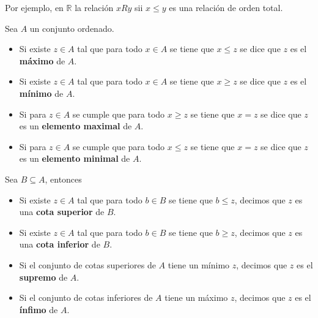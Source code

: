 \begin{example}
Por ejemplo, en $\mathbb{R}$ la relación $xRy$ sii $x \leq y$ es una relación de orden total.
\end{example}


\begin{definition} \label{maximo}

Sea $A$ un conjunto ordenado.  

\begin{itemize}

\item Si existe $z \in A$ tal que para todo $x \in A$ se tiene que $x \leq z$ se dice que $z$ es el \textbf{máximo}  de $A$.

\item Si existe $z \in A$ tal que para todo $x \in A$ se tiene que $x \geq z$ se dice que $z$ es el \textbf{mínimo}  de $A$.

\item Si para $z \in A$ se cumple que para todo $x \geq z$ se tiene que $x = z$ se dice que $z$ es un \textbf{elemento maximal}  de $A$.

\item Si para $z \in A$ se cumple que para todo $x \leq z$ se tiene que $x = z$ se dice que $z$ es un \textbf{elemento minimal}  de $A$.

\end{itemize}

Sea $B \subseteq A$, entonces

\begin{itemize}

\item Si existe $z \in A$ tal que para todo $b \in B$ se tiene que $b \leq z$, decimos que $z$ es una \textbf{cota superior}  de $B$.

\item Si existe $z \in A$ tal que para todo $b \in B$ se tiene que $b \geq z$, decimos que $z$ es una \textbf{cota inferior}  de $B$.

\item Si el conjunto de cotas superiores de $A$ tiene un mínimo $z$, decimos que $z$ es el \textbf{supremo}  de $A$.

\item Si el conjunto de cotas inferiores de $A$ tiene un máximo $z$, decimos que $z$ es el \textbf{ínfimo}  de $A$.

\end{itemize}

\end{definition}

